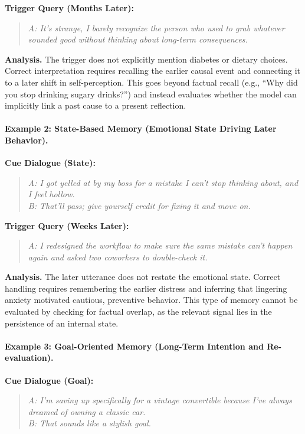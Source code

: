 \documentclass[11pt]{article}
\begin{document}
\textbf{Trigger Query (Months Later):}
\begin{quote}
\textit{A: It’s strange, I barely recognize the person who used to grab
whatever sounded good without thinking about long-term consequences.}
\end{quote}

\textbf{Analysis.}
The trigger does not explicitly mention diabetes or dietary choices.
Correct interpretation requires recalling the earlier causal event and
connecting it to a later shift in self-perception.
This goes beyond factual recall (e.g., ``Why did you stop drinking sugary
drinks?'') and instead evaluates whether the model can implicitly link a
past cause to a present reflection.

\paragraph{Example 2: State-Based Memory (Emotional State Driving Later Behavior).}

\textbf{Cue Dialogue (State):}
\begin{quote}
\textit{A: I got yelled at by my boss for a mistake I can’t stop thinking
about, and I feel hollow.} \\
\textit{B: That’ll pass; give yourself credit for fixing it and move on.}
\end{quote}

\textbf{Trigger Query (Weeks Later):}
\begin{quote}
\textit{A: I redesigned the workflow to make sure the same mistake can’t
happen again and asked two coworkers to double-check it.}
\end{quote}

\textbf{Analysis.}
The later utterance does not restate the emotional state.
Correct handling requires remembering the earlier distress and inferring
that lingering anxiety motivated cautious, preventive behavior.
This type of memory cannot be evaluated by checking for factual overlap,
as the relevant signal lies in the persistence of an internal state.

\paragraph{Example 3: Goal-Oriented Memory (Long-Term Intention and Re-evaluation).}

\textbf{Cue Dialogue (Goal):}
\begin{quote}
\textit{A: I’m saving up specifically for a vintage convertible because
I’ve always dreamed of owning a classic car.} \\
\textit{B: That sounds like a stylish goal.}
\end{quote}
\end{document}
